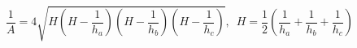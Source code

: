 \documentclass[12pt]{article}
\begin{document}
\[
    \frac{1}{A} = 4\sqrt{H\left(H - \frac{1}{h_a}\right)\left(H - \frac{1}{h_b}\right)\left(H - \frac{1}{h_c}\right)}, \, \, \, H = \frac{1}{2}\left(\frac{1}{h_a} + \frac{1}{h_b} + \frac{1}{h_c}\right)
\]
\end{document}
